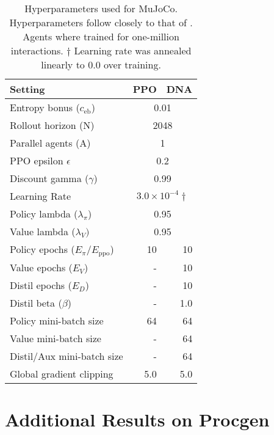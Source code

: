 \documentclass{article}
\begin{document}
\begin{table}[h]
    \centering
    \caption{Hyperparameters used for MuJoCo. Hyperparameters follow closely to that of \cite{schulman2017proximal}. Agents where trained for one-million interactions. $\dag$ Learning rate was annealed linearly to $0.0$ over training.}
    \begin{tabular}{l r r}
    \toprule
        Setting & PPO & DNA \\
    \midrule
Entropy bonus ($c_\text{eb}$)   & \multicolumn{2}{c}{0.01}\\ 
        Rollout horizon (N)             & \multicolumn{2}{c}{2048}\\ 
        Parallel agents (A)             & \multicolumn{2}{c}{1}\\ 
        PPO epsilon $\epsilon$          & \multicolumn{2}{c}{0.2}\\ 
        Discount gamma ($\gamma$)       & \multicolumn{2}{c}{0.99}\\ 
Learning Rate                   & \multicolumn{2}{c}{$3.0 \times 10^{-4} \dag$}\\
        
        Policy lambda ($\lambda_\pi$)   & \multicolumn{2}{c}{0.95}\\ 
        Value lambda ($\lambda_V)$     & \multicolumn{2}{c}{0.95}\\  
        \midrule
        Policy epochs ($E_\pi/E_\text{ppo}$) & 10 & 10 \\
        Value epochs ($E_V$)            & - & 10 \\
        Distil epochs ($E_D$)       & - & 10 \\
        Distil beta ($\beta$)       & - & 1.0 \\
        
        Policy mini-batch size          & 64 & 64 \\ 
        Value mini-batch size           & - & 64 \\
        Distil/Aux mini-batch size      & -  & 64 \\
        Global gradient clipping        & 5.0 & 5.0 \\
    \bottomrule
    \end{tabular}
    \label{tab:mujoco_hps}
\end{table}

\clearpage

\section{Additional Results on Procgen}
\label{app:procgen}
\end{document}
